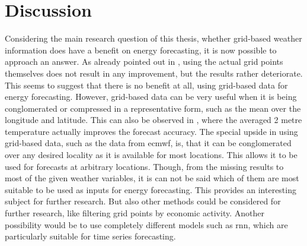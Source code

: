 \chapter{Discussion}
\label{ch:discussion}

Considering the main research question of this thesis, whether grid-based weather information does have a benefit on energy forecasting, it is now possible to approach an answer. As already pointed out in , using the actual grid points themselves does not result in any improvement, but the results rather deteriorate. This seems to suggest that there is no benefit at all, using grid-based data for energy forecasting. However, grid-based data can be very useful when it is being conglomerated or compressed in a representative form, such as the mean over the longitude and latitude. This can also be observed in , where the averaged 2 metre temperature actually improves the forecast accuracy. The special upside in using grid-based data, such as the data from \gls{ecmwf}, is, that it can be conglomerated over any desired locality as it is available for most locations. This allows it to be used for forecasts at arbitrary locations. Though, from the missing results to most of the given weather variables, it is can not be said which of them are most suitable to be used as inputs for energy forecasting. This provides an interesting subject for further research. But also other methods could be considered for further research, like filtering grid points by economic activity. Another possibility would be to use completely different models such as \gls{rnn}, which are particularly suitable for time series forecasting.\\

%
